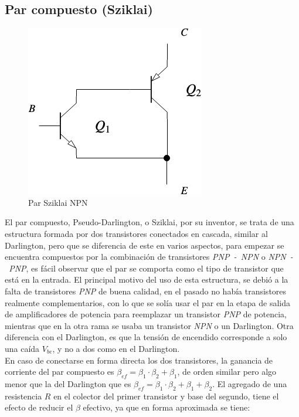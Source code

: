 
\subsection{Par compuesto (Sziklai)}

\label{section:sziklai}

\begin{figure}
\begin{center}
\includegraphics[width=0.48 \textwidth, angle=0]{./img/sziklai/sziklai0.png}
\end{center}
\caption{\label{fig:fig_sziklai_cir_0}\footnotesize{Par Sziklai NPN}}
\end{figure}

El par compuesto, Pseudo-Darlington, o Sziklai, por su inventor, se trata de una estructura formada por dos transistores conectados en cascada, similar al Darlington, pero que se diferencia de este en varios aspectos, para empezar se encuentra compuestos por la combinación de transistores \textit{PNP~-~NPN} o \textit{NPN~-~PNP}, es fácil observar que el par se comporta como el tipo de transistor que está en la entrada. El principal motivo del uso de esta estructura, se debió a la falta de transistores \textit{PNP} de buena calidad, en el pasado no había transistores realmente complementarios, con lo que se solía usar el par en la etapa de salida de amplificadores de potencia para reemplazar un transistor \textit{PNP} de potencia, mientras que en la otra rama se usaba un transistor \textit{NPN} o un Darlington. Otra diferencia con el Darlington, es que la tensión de encendido corresponde a solo una caída $V_{be}$, y no a dos como en el Darlington.\\
En caso de conectarse en forma directa los dos transistores, la ganancia de corriente del par compuesto es $\beta_{ef} = \beta_{1} \cdot \beta_{2} + \beta_{1}$, de orden similar pero algo menor que la del Darlington que es $\beta_{ef} = \beta_{1} \cdot \beta_{2} + \beta_{1} + \beta_{2}$. El agregado de una resistencia $R$ en el colector del primer transistor y base del segundo, tiene el efecto de reducir el $\beta$ efectivo, ya que en forma aproximada se tiene:


